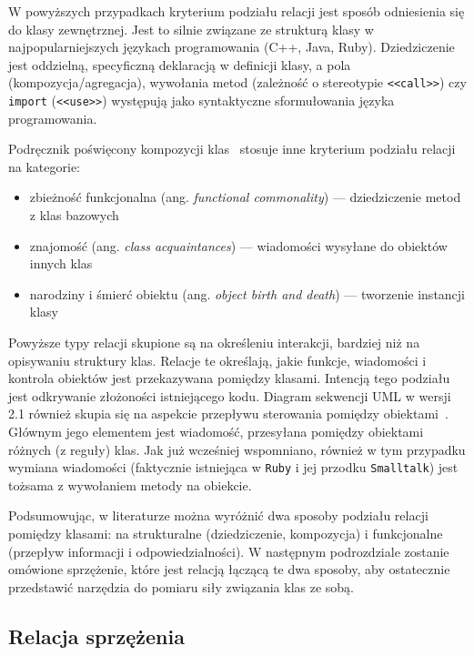 W powyższych przypadkach kryterium podziału relacji jest sposób odniesienia się do klasy zewnętrznej.
Jest to silnie związane ze strukturą klasy w najpopularniejszych językach programowania (C++, Java, Ruby).
Dziedziczenie jest oddzielną, specyficzną deklaracją w definicji klasy, a pola (kompozycja/agregacja), wywołania
metod (zależność o stereotypie \texttt{<<call>>}) czy \texttt{import} (\texttt{<<use>>}) występują jako syntaktyczne
sformułowania języka programowania.

Podręcznik poświęcony kompozycji klas~\cite{nierstrasz1995object} stosuje inne kryterium podziału relacji na kategorie:
\begin{itemize}
    \item zbieżność funkcjonalna (ang. \textit{functional commonality}) --- dziedziczenie metod z klas bazowych
    \item znajomość (ang. \textit{class acquaintances}) --- wiadomości wysyłane do obiektów innych klas
    \item narodziny i śmierć obiektu (ang. \textit{object birth and death}) --- tworzenie instancji klasy
\end{itemize}

Powyższe typy relacji skupione są na określeniu interakcji, bardziej niż na opisywaniu struktury klas.
Relacje te określają, jakie funkcje, wiadomości i kontrola obiektów jest przekazywana pomiędzy klasami.
Intencją tego podziału jest odkrywanie złożoności istniejącego kodu.
Diagram sekwencji UML w wersji 2.1 również skupia się na aspekcie przepływu sterowania pomiędzy obiektami~\cite{dkabrowski2007modelowanie:sequence}.
Głównym jego elementem jest wiadomość, przesyłana pomiędzy obiektami różnych (z reguły) klas.
Jak już wcześniej wspomniano, również w tym przypadku wymiana wiadomości (faktycznie istniejąca w \texttt{Ruby} i jej przodku
\texttt{Smalltalk}) jest tożsama z wywołaniem metody na obiekcie.

Podsumowując, w literaturze można wyróżnić dwa sposoby podziału relacji pomiędzy klasami: na strukturalne
(dziedziczenie, kompozycja) i funkcjonalne (przepływ informacji i odpowiedzialności).
W następnym podrozdziale zostanie omówione sprzężenie, które jest relacją łączącą te dwa sposoby, aby ostatecznie
przedstawić narzędzia do pomiaru siły związania klas ze sobą.

\subsection{Relacja sprzężenia}

